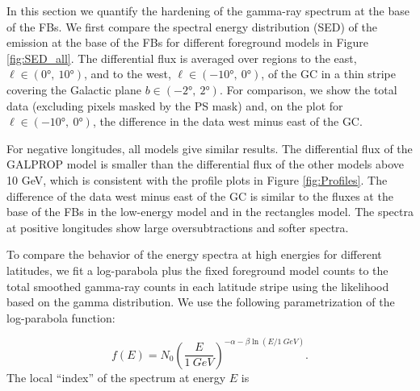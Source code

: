 In this section we quantify the hardening of the gamma-ray spectrum at the base of the FBs. 
We first compare the spectral energy distribution (SED) of the emission at the base of the FBs for different foreground models in Figure \ref{fig:SED_all}. 
The differential flux is averaged over regions to the east, $\ell \in (\ang{0},\ \ang{10})$, and to the west, $\ell \in (\ang{-10},\ \ang{0})$, of the GC
in a thin stripe covering the Galactic plane $b \in (\ang{-2},\ \ang{2})$. 
For comparison, we show the total data (excluding pixels masked by the PS mask) and, on the plot for $\ell \in (\ang{-10},\ \ang{0})$, the difference in the data west minus east
of the GC.

For negative longitudes, all models give similar results. 
The differential flux of the GALPROP model is smaller than the differential flux of the other models above 10 GeV, 
which is consistent with the profile plots in Figure \ref{fig:Profiles}.
The difference of the data west minus east of the GC is similar to the fluxes at the base of the FBs in the low-energy model and in the rectangles model. 
The spectra at positive longitudes show large oversubtractions and softer spectra. 

To compare the behavior of the energy spectra at high energies for different latitudes, 
we fit a log-parabola plus the fixed foreground model counts to the 
total smoothed gamma-ray counts in each latitude stripe using the likelihood based on the gamma distribution.
We use the following parametrization of the log-parabola function:

 \begin{equation}
 f(E) = N_0 \left(\frac{E}{\SI{1}{GeV}}\right)^{-\alpha - \beta \ln(E / \SI{1}{GeV})}.
 \end{equation}
The local ``index'' of the spectrum at energy $E$ is

